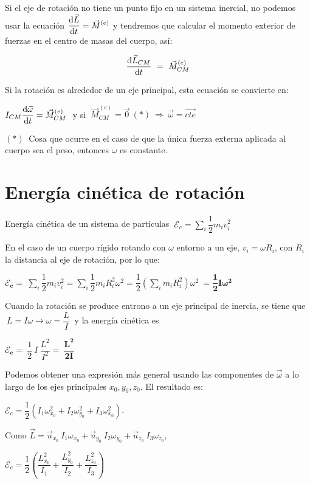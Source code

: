 Si el eje de rotación no tiene un punto fijo en un sistema inercial, no podemos usar la ecuación $\displaystyle \dv{\vec L}{t}=\vec M^{(e)}$ y tendremos que calcular el momento exterior de fuerzas en el centro de masas del cuerpo, así:

$$ \displaystyle \dv{\vec L_{CM}}{t} \ = \ \vec M_{CM}^{(e)} $$

Si la rotación es alrededor de un eje principal, esta ecuación se convierte en:

$ I_{CM}\displaystyle \dv{\vec \omega}{t}=\vec M_{CM}^{(e)}\ $ y si $\ \vec M_{CM}^{(e)}=\vec 0 \ (*)\ \Rightarrow \ \vec \omega=\overrightarrow{cte} $

$(*)\ $ Cosa que ocurre en el caso de que la única fuerza externa aplicada al cuerpo sea el peso, entonces $\omega$ es constante.

\section{Energía cinética de rotación}

Energía cinética de un sistema de partículas $\ \displaystyle \mathcal E_c=\sum_i \dfrac 1 2 m_i v_i^2$

En el caso de un cuerpo rígido rotando con $\omega$ entorno a un eje, $v_i=\omega R_i$, con $R_i$ la distancia al eje de rotación, por lo que:

$\displaystyle \boldsymbol{ \mathcal E_c=} \ \sum_i \dfrac 1 2 m_i v_i^2=\sum_i \dfrac 1 2 m_i R_i^2 \omega^2 =\dfrac 1 2 \left( \sum_i m_i R_i^2 \right) \omega^2 \ \boldsymbol{ =\dfrac 1 2 I \omega^2 }$

Cuando la rotación se produce entrono a un eje principal de inercia, se tiene que $\ L=I\omega \to \omega=\dfrac L I \ $ y la energía cinética es

$\boldsymbol{ \mathcal E_c=}\  \dfrac 1 2 \  I \   \dfrac {L^2} {I^2} = \ \boldsymbol{ \dfrac{L^2}{2I}}$

Podemos obtener una expresión más general usando las componentes de $\vec \omega$ a lo largo de los ejes principales $x_0, y_0, z_0$. El resultado es:

$\mathcal E_c=\dfrac 1 2 \left( I_1 \omega^2_{x_0}+I_2 \omega^2_{y_0}+I_3 \omega^2_{x_0}\right)$.

Como $\vec L=\vec u_{x_0} \ I_1 \omega_{x_0}+\vec u_{y_0} \ I_2 \omega_{y_0} +\vec u_{z_0} \ I_3 \omega_{z_0}$,

$\mathcal E_c= \dfrac 1 2 \left(  \dfrac{L^2_{x_0}}{I_1}+  \dfrac{L^2_{y_0}}{I_2}+  \dfrac{L^2_{z_0}}{I_3} \right)$

